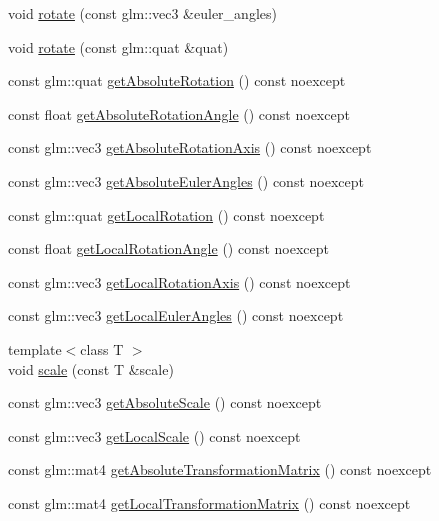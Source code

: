 \begin{DoxyCompactItemize}
\item 
void \hyperlink{class_transform_a2b4c1f2d0a62d0c89dedd88dbcdaa2d8}{rotate} (const glm\+::vec3 \&euler\+\_\+angles)
\item 
void \hyperlink{class_transform_ad51b8505353fa221c1a9d44590248e7e}{rotate} (const glm\+::quat \&quat)
\item 
const glm\+::quat \hyperlink{class_transform_adf0d22f16d1828804a038785d23aa782}{get\+Absolute\+Rotation} () const noexcept
\item 
const float \hyperlink{class_transform_abb2c3ea4aa73f73ee5a1e952e6ca572b}{get\+Absolute\+Rotation\+Angle} () const noexcept
\item 
const glm\+::vec3 \hyperlink{class_transform_aeeecb2d6949700678f7255a75e1aa109}{get\+Absolute\+Rotation\+Axis} () const noexcept
\item 
const glm\+::vec3 \hyperlink{class_transform_a680e2ca55154ee64067b637b3089a49a}{get\+Absolute\+Euler\+Angles} () const noexcept
\item 
const glm\+::quat \hyperlink{class_transform_af4c4efeddf0447ded7aedc65372691bc}{get\+Local\+Rotation} () const noexcept
\item 
const float \hyperlink{class_transform_adced558caa60dba283bc5711cd7f1357}{get\+Local\+Rotation\+Angle} () const noexcept
\item 
const glm\+::vec3 \hyperlink{class_transform_a861beae13233ea457e0eb906ac9f6ae5}{get\+Local\+Rotation\+Axis} () const noexcept
\item 
const glm\+::vec3 \hyperlink{class_transform_afd6613e7f6ecea657d9c4faf4b3772bd}{get\+Local\+Euler\+Angles} () const noexcept
\item 
{\footnotesize template$<$class T $>$ }\\void \hyperlink{class_transform_aa60a0073e2fd884226624f697ee31fe9}{scale} (const T \&scale)
\item 
const glm\+::vec3 \hyperlink{class_transform_a0c6436bf2df21cbf0675a86b84e3fb28}{get\+Absolute\+Scale} () const noexcept
\item 
const glm\+::vec3 \hyperlink{class_transform_aa9f7caf0eed7db1563ac72fc5726e2fe}{get\+Local\+Scale} () const noexcept
\item 
const glm\+::mat4 \hyperlink{class_transform_ab20c19ccdee7831086d2632a92eb078a}{get\+Absolute\+Transformation\+Matrix} () const noexcept
\item 
const glm\+::mat4 \hyperlink{class_transform_a503a33b8ca90f9e63d7f46c692561363}{get\+Local\+Transformation\+Matrix} () const noexcept
\item 

\end{DoxyCompactItemize}
